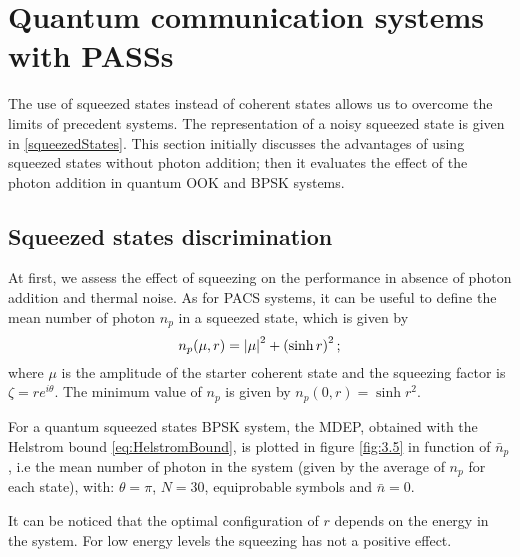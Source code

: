 \section{Quantum communication systems with PASSs}
    The use of squeezed states instead of coherent states allows us to overcome the limits
    of precedent systems. The representation of a noisy squeezed state is given in 
    \ref{squeezedStates}. This section initially discusses the advantages of using squeezed states 
    without photon addition; then it evaluates the effect of the photon addition
    in quantum OOK and BPSK systems.

    \subsection{Squeezed states discrimination}
        At first, we assess the effect of squeezing on the performance in absence of photon 
        addition and thermal noise. As for PACS systems, it can be useful to define the mean 
        number of photon $n_p$ in a squeezed state, which is given by
        \begin{equation}
            n_p(\mu,r) = \absolutevalue{\mu}^2 + \left(\sinh{r}\right)^2;
        \end{equation}
        where $\mu$ is the amplitude of the starter coherent state and the squeezing factor
        is $\zeta = r e^{i\theta}$. The minimum value of $n_p$ is given by $n_p(0,r) = \sinh{r}^2$.

        For a quantum squeezed states BPSK system, the MDEP, obtained with the Helstrom bound 
        \ref{eq:HelstromBound}, is plotted in figure \ref{fig:3.5} in function of $\bar{n}_p$,
        i.e the mean number of photon in the system (given by the average of $n_p$ for each state), with:
        $\theta=\pi$, $N=30$, equiprobable symbols and $\bar{n}=0$.

        It can be noticed that the optimal configuration of $r$ depends on the energy in the 
        system. For low energy levels the squeezing has not a positive effect.

